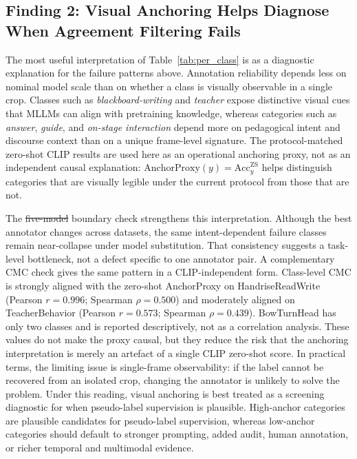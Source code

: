 \documentclass{ieeeaccess}
\providecommand{\DIFadd}[1]{{\protect\color{blue}\uwave{#1}}} %
\providecommand{\DIFdel}[1]{{\protect\color{red}\sout{#1}}}                      %
\providecommand{\DIFaddbegin}{} %
\providecommand{\DIFaddend}{} %
\providecommand{\DIFdelbegin}{} %
\providecommand{\DIFdelend}{} %
\newcommand{\DIFscaledelfig}{0.5}
\newlength{\DIFdelgraphicswidth} %
\newlength{\DIFdelgraphicsheight} %
\newcommand{\DIFaddincludegraphics}[2][]{{\color{blue}\fbox{\DIFOincludegraphics[#1]{#2}}}} %
\newcommand{\DIFdelincludegraphics}[2][]{%
\sbox{\DIFdelgraphicsbox}{\DIFOincludegraphics[#1]{#2}}%
\settoboxwidth{\DIFdelgraphicswidth}{\DIFdelgraphicsbox} %
\settoboxtotalheight{\DIFdelgraphicsheight}{\DIFdelgraphicsbox} %
\scalebox{\DIFscaledelfig}{%
\parbox[b]{\DIFdelgraphicswidth}{\usebox{\DIFdelgraphicsbox}\\[-\baselineskip] \rule{\DIFdelgraphicswidth}{0em}}\llap{\resizebox{\DIFdelgraphicswidth}{\DIFdelgraphicsheight}{%
\setlength{\unitlength}{\DIFdelgraphicswidth}%
\begin{picture}(1,1)%
\thicklines\linethickness{2pt} %
{\color[rgb]{1,0,0}\put(0,0){\framebox(1,1){}}}%
{\color[rgb]{1,0,0}\put(0,0){\line( 1,1){1}}}%
{\color[rgb]{1,0,0}\put(0,1){\line(1,-1){1}}}%
\end{picture}%
}\hspace*{3pt}}} %
} %
\DeclareRobustCommand{\DIFaddbegin}{\DIFOaddbegin \let\includegraphics\DIFaddincludegraphics} %
\DeclareRobustCommand{\DIFaddend}{\DIFOaddend \let\includegraphics\DIFOincludegraphics} %
\DeclareRobustCommand{\DIFdelbegin}{\DIFOdelbegin \let\includegraphics\DIFdelincludegraphics} %
\DeclareRobustCommand{\DIFdelend}{\DIFOaddend \let\includegraphics\DIFOincludegraphics} %
\begin{document}
\subsection{Finding 2: Visual Anchoring Helps Diagnose When Agreement
Filtering Fails}

The most useful interpretation of Table~\ref{tab:per_class} is as a
diagnostic explanation for the failure patterns above.
Annotation reliability depends less on nominal model scale than on
whether a class is visually observable in a single crop.
Classes such as \textit{blackboard-writing} and \textit{teacher}
expose distinctive visual cues that MLLMs can align with pretraining
knowledge, whereas categories such as \textit{answer}, \textit{guide},
and \textit{on-stage interaction} depend more on pedagogical intent and
discourse context than on a unique frame-level signature.
The protocol-matched zero-shot CLIP results are used here as
an operational anchoring proxy, not as an independent causal
explanation: $\mathrm{AnchorProxy}(y)=\mathrm{Acc}^{\mathrm{ZS}}_{y}$
helps distinguish categories that are visually legible under the
current protocol from those that are not.

The \DIFdelbegin \DIFdel{five-model }\DIFdelend \DIFaddbegin \DIFadd{ten-model }\DIFaddend boundary check strengthens this interpretation.
Although the best annotator changes across datasets, the same
intent-dependent failure classes remain near-collapse under model
substitution.
That consistency suggests a task-level bottleneck, not a defect
specific to one annotator pair.
A complementary CMC check gives the same pattern in a CLIP-independent
form. Class-level CMC is strongly aligned with the zero-shot
AnchorProxy on HandriseReadWrite (Pearson $r=0.996$; Spearman
$\rho=0.500$) and moderately aligned on TeacherBehavior (Pearson
$r=0.573$; Spearman $\rho=0.439$). BowTurnHead has only two classes and
is reported descriptively, not as a correlation
analysis. These values do not make the proxy causal, but they reduce
the risk that the anchoring interpretation is merely an artefact of a
single CLIP zero-shot score.
In practical terms, the limiting issue is single-frame observability:
if the label cannot be recovered from an isolated crop, changing the
annotator is unlikely to solve the problem.
Under this reading, visual anchoring is best treated as a screening
diagnostic for when pseudo-label supervision is plausible.
High-anchor categories are plausible candidates for pseudo-label
supervision, whereas low-anchor categories should default to stronger
prompting, added audit, human annotation, or richer temporal and
multimodal evidence.
\end{document}
